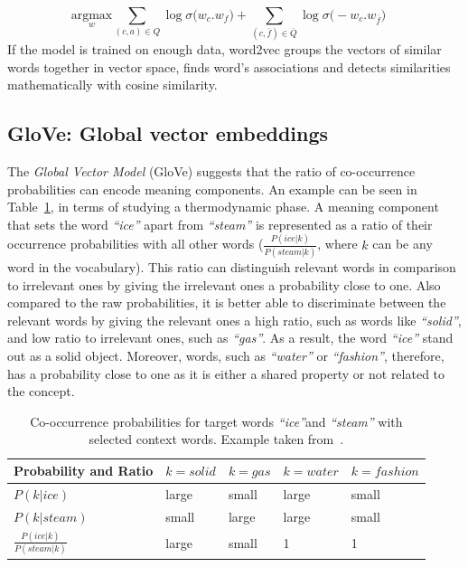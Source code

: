 \begin{equation}
\label{eq:w2v_negative}
\underset { w }{ \mathrm{ argmax } } \sum _{ (c,a)\in Q }^{  }{ \log { \sigma ( } w_{ c }.w_{ f }) } +\sum _{ (c,\overline {f})\in \overline { Q }  }^{  }{ \log { \sigma ( } -w_{ c }.w_{ \overline {f} })\quad  } 
\end{equation}
If the model is trained on enough data, word2vec groups the vectors of similar words together in vector space, finds word’s associations and detects similarities mathematically with cosine similarity. 
\subsection{GloVe: Global vector embeddings}
\label{subsec:GloVe}
The \emph{Global Vector Model} (GloVe) suggests that the ratio of co-occurrence probabilities can encode meaning components. An example can be seen in Table~\ref{table:tab_1}, in terms of studying a thermodynamic phase. A meaning component that sets the word \emph{``ice''} apart from \emph{``steam''} is represented as a ratio of their occurrence probabilities with all other words \big($\frac { P(ice|k) }{ P(steam|k) } $, where $k$ can be any word in the vocabulary\big). This ratio can distinguish relevant words in comparison to irrelevant ones by giving the irrelevant ones a probability close to one. Also compared to the raw probabilities, it is better able to discriminate between the relevant words by giving the relevant ones a high ratio, such as words like \emph{``solid''}, and low ratio to irrelevant ones, such as \emph{``gas''}. As a result, the word \emph{``ice''} stand out as a solid object. Moreover, words, such as \emph{``water''} or \emph{``fashion''}, therefore, has a probability close to one as it is either a shared property or not related to the concept.\\
\begin{table}[]
\centering

\begin{tabular}{@{}l|l|l|l|l@{}}
\toprule
Probability and Ratio &  $k=solid$& $k=gas$ & $k=water$ &$k= fashion$  \\ \midrule $P(k|ice)$& {\color[HTML]{CB0000}large} &  {\color[HTML]{329A9D}small} & {\color[HTML]{CB0000}large} & {\color[HTML]{329A9D}small} \\\midrule
  $P(k|steam)$&{\color[HTML]{329A9D}small}  & {\color[HTML]{CB0000}large} &  {\color[HTML]{CB0000}large}&{\color[HTML]{329A9D}small}  \\\midrule
 $\frac { P(ice|k) }{ P(steam|k) } $& {\color[HTML]{CB0000}large} &  {\color[HTML]{329A9D}small}&  1 &    1  \\\midrule
\end{tabular}%
\caption{Co-occurrence probabilities for target words \emph{``ice''}and \emph{``steam''} with selected context words. Example taken from~.}
\label{table:tab_1}
\end{table}
